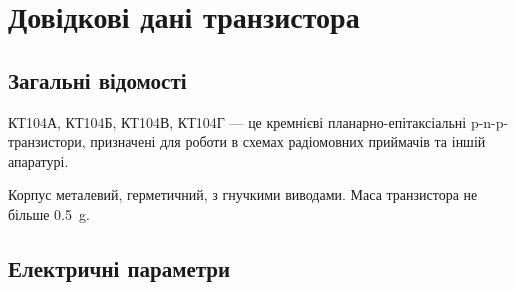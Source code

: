\documentclass[ukrainian,utf8,nocolumnsxix,nocolumnxxxi,nocolumnxxxii]{eskdtext}
\let\stdsection\section
\renewcommand\section{\newpage\stdsection}
\begin{document}
	\section{Довідкові дані транзистора}
		\subsection{Загальні відомості}
			КТ104А, КТ104Б, КТ104В, КТ104Г --- це кремнієві планарно-епітаксіальні \mbox{p-n-p}-транзистори, призначені для роботи в схемах радіомовних приймачів та іншій апаратурі.
		
			Корпус металевий, герметичний, з гнучкими виводами. Маса транзистора не більше \SI{0,5}{\gram}.
		
		\subsection{Електричні параметри}
		
\end{document}
